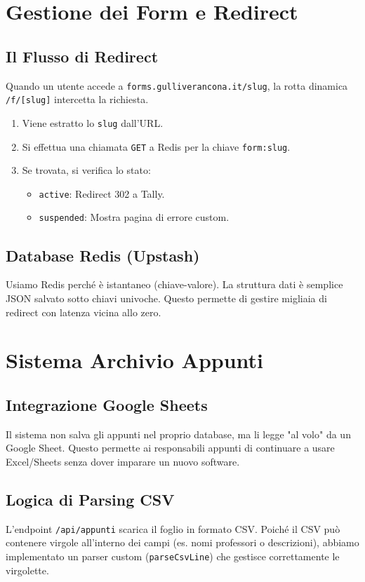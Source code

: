 \documentclass[11pt,a4paper,oneside]{book}
\begin{document}
\chapter{Gestione dei Form e Redirect}
\section{Il Flusso di Redirect}
Quando un utente accede a \texttt{forms.gulliverancona.it/slug}, la rotta dinamica \texttt{/f/[slug]} intercetta la richiesta.
\begin{enumerate}
    \item Viene estratto lo \texttt{slug} dall'URL.
    \item Si effettua una chiamata \texttt{GET} a Redis per la chiave \texttt{form:slug}.
    \item Se trovata, si verifica lo stato:
    \begin{itemize}
        \item \texttt{active}: Redirect 302 a Tally.
        \item \texttt{suspended}: Mostra pagina di errore custom.
    \end{itemize}
\end{enumerate}

\section{Database Redis (Upstash)}
Usiamo Redis perché è istantaneo (chiave-valore). La struttura dati è semplice JSON salvato sotto chiavi univoche. Questo permette di gestire migliaia di redirect con latenza vicina allo zero.

\chapter{Sistema Archivio Appunti}
\section{Integrazione Google Sheets}
Il sistema non salva gli appunti nel proprio database, ma li legge "al volo" da un Google Sheet. Questo permette ai responsabili appunti di continuare a usare Excel/Sheets senza dover imparare un nuovo software.

\section{Logica di Parsing CSV}
L'endpoint \texttt{/api/appunti} scarica il foglio in formato CSV. Poiché il CSV può contenere virgole all'interno dei campi (es. nomi professori o descrizioni), abbiamo implementato un parser custom (\texttt{parseCsvLine}) che gestisce correttamente le virgolette.
\end{document}
